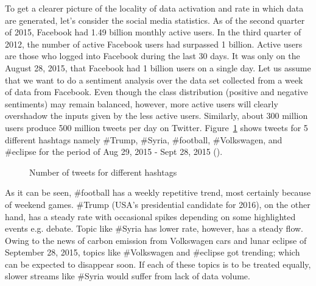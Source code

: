 To get a clearer picture of the locality of data activation and rate in which data are generated, let's consider the social media statistics. As of the second quarter of 2015, Facebook had 1.49 billion monthly active users. In the third quarter of 2012, the number of active Facebook users had surpassed 1 billion. Active users are those who logged into Facebook during the last 30 days. It was only on the August 28, 2015, that Facebook had 1 billion users on a single day. Let us assume that we want to do a sentiment analysis over the data set collected from a week of data from Facebook. Even though the class distribution (positive and negative sentiments)  may remain balanced, however, more active users will clearly overshadow the inputs given by the less active users. Similarly, about 300 million users produce 500 million tweets per day on Twitter. Figure~\ref{fig:intro:tweets} shows tweets for 5 different hashtags namely \#Trump, \#Syria, \#football, \#Volkswagen, and \#eclipse for the period of Aug 29, 2015 - Sept 28, 2015 (\cite{internet:topsy:tweets}). 
\begin{figure}[htbp] 
    \begin{center}
        \caption{Number of tweets for different hashtags }
        \label{fig:intro:tweets}
    \end{center}
\end{figure}
\noindent As it can be seen, \#football has a weekly repetitive trend, most certainly because of weekend games. \#Trump (USA's presidential candidate for 2016), on the other hand, has a steady rate with occasional spikes depending on some highlighted events e.g. debate. Topic like \#Syria has lower rate, however, has a steady flow. Owing to the news of carbon emission from Volkswagen cars and lunar eclipse of September 28, 2015, topics like \#Volkswagen and \#eclipse got trending; which can be expected to disappear soon. If each of these topics is to be treated equally, slower streams like \#Syria would suffer from lack of data volume.

